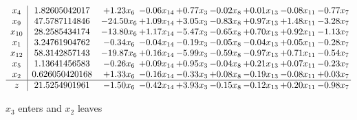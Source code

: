 \documentclass[8pt]{article}
\begin{document}
 \[\begin{array}{c| c c@{\hskip 2pt} c@{\hskip 2pt} c@{\hskip 2pt} c@{\hskip 2pt} c@{\hskip 2pt} c@{\hskip 2pt} c@{\hskip 2pt} }
 x_{4}   &  1.82605042017 & +  1.23 x_{6} & -0.06 x_{14} & +  0.77 x_{3} & -0.02 x_{8} & +  0.01 x_{13} & -0.08 x_{11} & -0.77 x_{7}\\
 x_{9}   &  47.5787114846 & -24.50 x_{6} & +  1.09 x_{14} & +  3.05 x_{3} & -0.83 x_{8} & +  0.97 x_{13} & +  1.48 x_{11} & -3.28 x_{7}\\
 x_{10}   &  28.2585434174 & -13.80 x_{6} & +  1.17 x_{14} & -5.47 x_{3} & -0.65 x_{8} & +  0.70 x_{13} & +  0.92 x_{11} & -1.13 x_{7}\\
 x_{1}   &  3.24761904762 & -0.34 x_{6} & -0.04 x_{14} & -0.19 x_{3} & -0.05 x_{8} & -0.04 x_{13} & +  0.05 x_{11} & -0.28 x_{7}\\
 x_{12}   &  58.3142857143 & -19.87 x_{6} & +  0.16 x_{14} & -5.99 x_{3} & -0.59 x_{8} & -0.97 x_{13} & +  0.71 x_{11} & -0.54 x_{7}\\
 x_{5}   &  1.13641456583 & -0.26 x_{6} & +  0.09 x_{14} & +  0.95 x_{3} & -0.04 x_{8} & +  0.21 x_{13} & +  0.07 x_{11} & -0.23 x_{7}\\
 x_{2}   &  0.626050420168 & +  1.33 x_{6} & -0.16 x_{14} & -0.33 x_{3} & +  0.08 x_{8} & -0.19 x_{13} & -0.08 x_{11} & +  0.03 x_{7}\\
\hline
z    &  21.5254901961 & -1.50 x_{6} & -0.42 x_{14} & +  3.93 x_{3} & -0.15 x_{8} & -0.12 x_{13} & +  0.20 x_{11} & -0.98 x_{7}\\
\end{array}\]


 $ x_{3} $ enters and $ x_{2} $ leaves 
\end{document}
